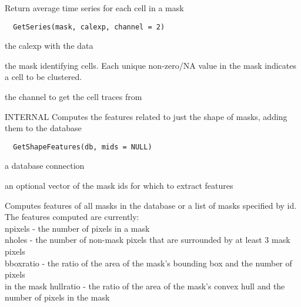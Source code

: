 \documentclass[a4paper]{book}
\begin{document}
%
\begin{Description}\relax
Return average time series for each cell in a mask
\end{Description}
%
\begin{Usage}
\begin{verbatim}
  GetSeries(mask, calexp, channel = 2)
\end{verbatim}
\end{Usage}
%
\begin{Arguments}
\begin{ldescription}
\item[\code{calexp}] the calexp with the data

\item[\code{mask}] the mask identifying cells.  Each unique
non-zero/NA value in the mask indicates a cell to be
clustered.

\item[\code{channel}] the channel to get the cell traces from
\end{ldescription}
\end{Arguments}
%
\begin{Description}\relax
INTERNAL Computes the features related to just the shape
of masks, adding them to the database
\end{Description}
%
\begin{Usage}
\begin{verbatim}
  GetShapeFeatures(db, mids = NULL)
\end{verbatim}
\end{Usage}
%
\begin{Arguments}
\begin{ldescription}
\item[\code{db}] a database connection

\item[\code{mids}] an optional vector of the mask ids for which
to extract features
\end{ldescription}
\end{Arguments}
%
\begin{Details}\relax
Computes features of all masks in the database or a list
of masks specified by id.  The features computed are
currently:\\{} npixels - the number of pixels in a mask
\\{} nholes - the number of non-mask pixels that are
surrounded by at least 3 mask pixels\\{} bboxratio - the
ratio of the area of the mask's bounding box and the
number of pixels\\{} in the mask hullratio - the ratio of
the area of the mask's convex hull and the number of
pixels in the mask\\{}
\end{Details}
\end{document}
